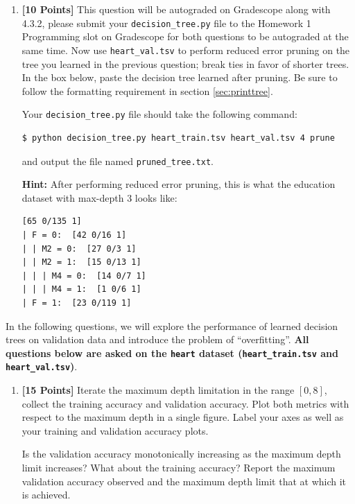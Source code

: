 \begin{enumerate}
\item {\bf [10 Points]} This question will be autograded on Gradescope along with 4.3.2, please submit your \texttt{decision\_tree.py} file to the Homework 1 Programming slot on Gradescope for both questions to be autograded at the same time. Now use \texttt{heart\_val.tsv} to perform reduced error pruning on the tree you learned in the previous question; break ties in favor of shorter trees. In the box below, paste the decision tree learned after pruning. Be sure to follow the formatting requirement in section \ref{sec:printtree}.

Your \texttt{decision\_tree.py} file should take the following command: 
    \begin{lstlisting}[language=Shell]
$ python decision_tree.py heart_train.tsv heart_val.tsv 4 prune
\end{lstlisting} 
    and output the file named \texttt{pruned\_tree.txt}.

\textbf{Hint: }After performing reduced error pruning, this is what the education dataset with max-depth 3 looks like: 
\begin{lstlisting}[language=Shell]
[65 0/135 1]
| F = 0:  [42 0/16 1]
| | M2 = 0:  [27 0/3 1]
| | M2 = 1:  [15 0/13 1]
| | | M4 = 0:  [14 0/7 1]
| | | M4 = 1:  [1 0/6 1]
| F = 1:  [23 0/119 1]
\end{lstlisting}
    

\end{enumerate}

In the following questions, we will explore the performance of learned decision trees on validation data and introduce the problem of ``overfitting''. \textbf{All questions below are asked on the \texttt{heart} dataset (\texttt{heart\_train.tsv} and \texttt{heart\_val.tsv})}.

\begin{enumerate}
    \item[4.] {\bf [15 Points]} Iterate the maximum depth limitation in the range $[0, 8]$, collect the training accuracy and validation accuracy. Plot both metrics with respect to the maximum depth in a single figure. Label your axes as well as your training and validation accuracy plots.

    Is the validation accuracy monotonically increasing as the maximum depth limit increases? What about the training accuracy? Report the maximum validation accuracy observed and the maximum depth limit that at which it is achieved.

    \begin{tcolorbox}[fit,height=7cm, width=15cm, blank, borderline={1pt}{-2pt},nobeforeafter]
        
        
    \end{tcolorbox}


    \end{enumerate}



